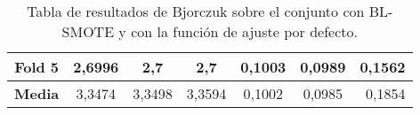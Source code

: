 \begin{table}[H]
{\begin{tabular}{|crrrrrr|}
\multicolumn{1}{|c|}{\textbf{Fold 5}} & \multicolumn{1}{c|}{2,6996}            & \multicolumn{1}{c|}{2,7}                 & \multicolumn{1}{c|}{\textbf{2,7}}  & \multicolumn{1}{c|}{0,1003}            & \multicolumn{1}{c|}{0,0989}              & 0,1562                             \\ \hline
\multicolumn{1}{|c|}{\textbf{Media}}  & \multicolumn{1}{c|}{3,3474}           & \multicolumn{1}{c|}{3,3498}              & \multicolumn{1}{c|}{3,3594}       & \multicolumn{1}{c|}{0,1002}           & \multicolumn{1}{c|}{0,0985}             & 0,1854                             \\ \hline
\end{tabular}%
}
\caption{Tabla de resultados de Bjorczuk sobre el conjunto con BL-SMOTE y con la función de ajuste por defecto.}\label{tablaBJORCZUKconBLSMOTEdefecto}
\end{table}



